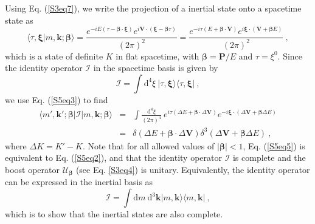 \documentclass[12pt]{iopart}
\begin{document}
Using Eq. (\ref{S3eq7}), we write the projection of a inertial state onto a spacetime 
state as 
%
    \begin{equation}
        \langle\tau,\boldsymbol{\xi}\vert m,\boldsymbol{k};\boldsymbol{\beta}\rangle 
        = \frac{e^{-i E\left(\tau-\boldsymbol{\beta}\cdot\boldsymbol{\xi}\right)}
        e^{i\boldsymbol{V}\cdot\left(\boldsymbol{\xi}-\boldsymbol{\beta}\tau\right)}}
        {(2\pi)^2}=\frac{e^{-i\tau(E+\boldsymbol{\beta}\cdot\boldsymbol{V})}
        e^{i\boldsymbol{\xi}\cdot(\boldsymbol{V}+\boldsymbol{\beta}E)}}{(2\pi)^2}\ ,
        \label{S5eq3}
    \end{equation}
%
which is a state of definite $K$ in flat spacetime, with $\boldsymbol{\beta}=
\boldsymbol{P}/E$ and $\tau=\xi^0$. Since the identity operator $\mathcal{I}$ in the 
spacetime basis is given by
%
    \begin{equation}
        \mathcal{I}=\int\mathrm{d}^4\xi\ \vert\tau,\boldsymbol{\xi}\rangle\langle\tau,
        \boldsymbol{\xi}\vert\ ,
        \label{S5eq4}
    \end{equation}
%
we use Eq. (\ref{S5eq3}) to find 
%
    \begin{eqnarray}
        \langle m',\boldsymbol{k}';\boldsymbol{\beta}\vert\mathcal{I}
        \vert m,\boldsymbol{k};\boldsymbol{\beta}\rangle&=&\int\frac{\mathrm{d}^4\xi}
        {(2\pi)^4}\ e^{i\tau(\Delta E+\boldsymbol{\beta}\cdot\Delta\boldsymbol{V})}
        e^{-i\boldsymbol{\xi}\cdot(\Delta\boldsymbol{V}+\boldsymbol{\beta}\Delta E)}\nonumber\\
        &=&\delta(\Delta E+\boldsymbol{\beta}\cdot\Delta\boldsymbol{V})\delta^3
        (\Delta\boldsymbol{V}+\boldsymbol{\beta}\Delta E)\ ,
        \label{S5eq5}
    \end{eqnarray}
%
where $\Delta K=K'-K$.  Note that for all allowed values of $\vert\boldsymbol{\beta}\vert<1$, 
Eq. (\ref{S5eq5}) is equivalent to Eq. (\ref{S5eq2}), and that the identity operator $\mathcal{I}$ 
is complete and the boost operator $\mathcal{U}_{\boldsymbol{\beta}}$ (see Eq. \ref{S3eq4}) 
is unitary. Equivalently, the identity operator can be expressed in the inertial basis as
%
    \begin{equation}
        \mathcal{I}=\int\mathrm{d}m\ \mathrm{d}^3\boldsymbol{k}
        \vert m,\boldsymbol{k}\rangle\langle m,\boldsymbol{k}\vert\ ,
        \label{S5eq6}
    \end{equation}
%
which is to show that the inertial states are also complete.
\end{document}
